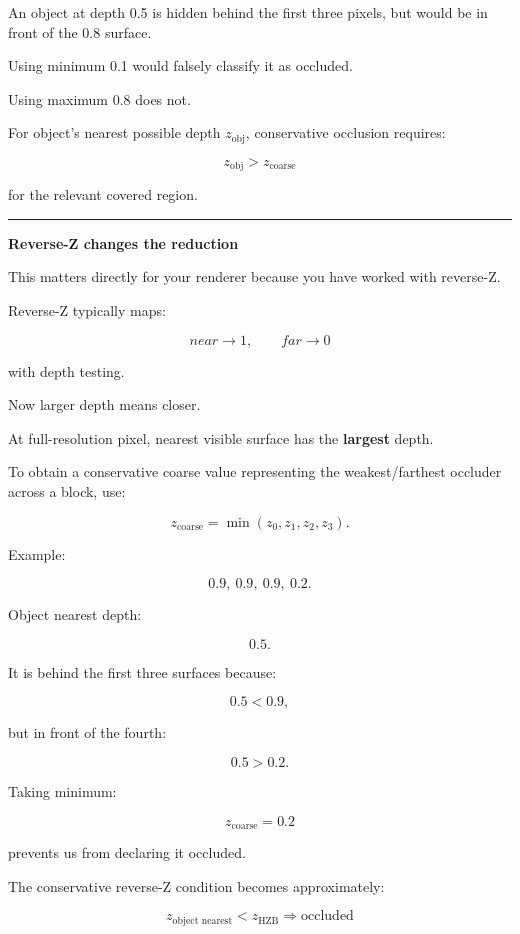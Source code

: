An object at depth 0.5 is hidden behind the first three pixels, but would be in front of the 0.8 surface.

Using minimum 0.1 would falsely classify it as occluded.

Using maximum 0.8 does not.

For object's nearest possible depth \(z_{\text{obj}}\), conservative occlusion requires:

\[
\boxed{
z_{\text{obj}}>z_{\text{coarse}}
}
\]

for the relevant covered region.

\begin{center}\rule{0.5\linewidth}{0.5pt}\end{center}

\textbf{Reverse-Z changes the reduction}

This matters directly for your renderer because you have worked with reverse-Z.

Reverse-Z typically maps:

\[
near\rightarrow1,
\qquad
far\rightarrow0
\]

with  depth testing.

Now larger depth means closer.

At full-resolution pixel, nearest visible surface has the \textbf{largest} depth.

To obtain a conservative coarse value representing the weakest/farthest occluder across a block, use:

\[
\boxed{
z_{\text{coarse}}
=
\min(z_0,z_1,z_2,z_3).
}
\]

Example:

\[
0.9,\ 0.9,\ 0.9,\ 0.2.
\]

Object nearest depth:

\[
0.5.
\]

It is behind the first three surfaces because:

\[
0.5<0.9,
\]

but in front of the fourth:

\[
0.5>0.2.
\]

Taking minimum:

\[
z_{\text{coarse}}=0.2
\]

prevents us from declaring it occluded.

The conservative reverse-Z condition becomes approximately:

\[
\boxed{
z_{\text{object nearest}}
<
z_{\text{HZB}}
\Rightarrow
\text{occluded}
}
\]

